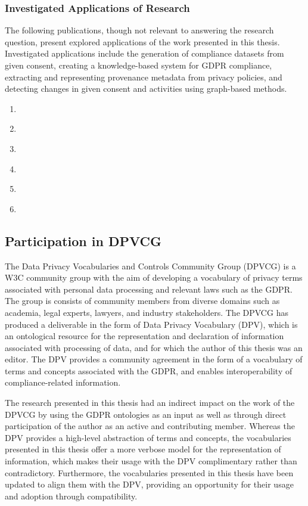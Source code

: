 \subsubsection{Investigated Applications of Research}
The following publications, though not relevant to answering the research question, present explored applications of the work presented in this thesis. Investigated applications include the generation of compliance datasets from given consent, creating a knowledge-based system for GDPR compliance, extracting and representing provenance metadata from privacy policies, and detecting changes in given consent and activities using graph-based methods.
\begin{enumerate}[resume]
    \item \textbf{}
    \item \textbf{}
    \item \textbf{}
    \item \textbf{}
    \item \textbf{}
    \item \textbf{}
\end{enumerate}

\subsection{Participation in DPVCG}
The Data Privacy Vocabularies and Controls Community Group (DPVCG) is a W3C community group with the aim of developing a vocabulary of privacy terms associated with personal data processing and relevant laws such as the GDPR. The group is consists of community members from diverse domains such as academia, legal experts, lawyers, and industry stakeholders. The DPVCG has produced a deliverable in the form of Data Privacy Vocabulary (DPV), which is an ontological resource for the representation and declaration of information associated with processing of data, and for which the author of this thesis was an editor. The DPV provides a community agreement in the form of a vocabulary of terms and concepts associated with the GDPR, and enables interoperability of compliance-related information.

The research presented in this thesis had an indirect impact on the work of the DPVCG by using the GDPR ontologies as an input as well as through direct participation of the author as an active and contributing member. Whereas the DPV provides a high-level abstraction of terms and concepts, the vocabularies presented in this thesis offer a more verbose model for the representation of information, which makes their usage with the DPV complimentary rather than contradictory. Furthermore, the vocabularies presented in this thesis have been updated to align them with the DPV, providing an opportunity for their usage and adoption through compatibility.


